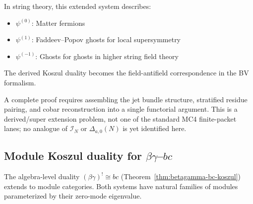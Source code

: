 \begin{example}
In string theory, this extended system describes:
\begin{itemize}
\item $\psi^{(0)}$: Matter fermions
\item $\psi^{(1)}$: Faddeev--Popov ghosts for local supersymmetry
\item $\psi^{(-1)}$: Ghosts for ghosts in higher string field theory
\end{itemize}
The derived Koszul duality becomes the field-antifield correspondence in the BV formalism.
\end{example}

\begin{remark}[Scope]\label{rem:extended-ferm-ghost-scope}
A complete proof requires assembling the jet bundle structure,
stratified residue pairing, and cobar reconstruction into a single
functorial argument.  This is a derived/super extension problem, not
one of the standard MC4 finite-packet lanes; no analogue of
$\mathcal{I}_N$ or $\Delta_{a,0}(N)$ is yet identified here.
\end{remark}

\subsection{Module Koszul duality for \texorpdfstring{$\beta\gamma$--$bc$}{betagamma--bc}}
\label{sec:betagamma-bc-modules}

The algebra-level duality $(\beta\gamma)^! \cong bc$
(Theorem~\ref{thm:betagamma-bc-koszul}) extends to module
categories.  Both systems have natural families of modules
parameterized by their zero-mode eigenvalue.


